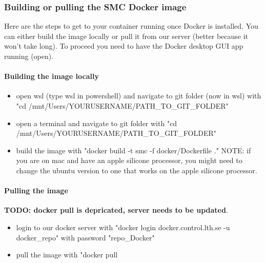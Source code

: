 \subsubsection{Building or pulling the SMC Docker image}
Here are the steps to get to your container running once Docker is installed.
You can either build the image locally or pull it from our server (better because it won't take long).
To proceed you need to have the Docker desktop GUI app running (open).

\paragraph{ Building the image locally}
\begin{itemize}
\item [WINDOWS] open wsl (type wsl in powershell) and navigate to git folder (now in wsl) with 
		\newline
		"cd /mnt/Users/YOURUSERNAME/PATH\_TO\_GIT\_FOLDER"
\item [MAC] open a terminal and navigate to git folder with 
		\newline
		"cd /mnt/Users/YOURUSERNAME/PATH\_TO\_GIT\_FOLDER"
\item build the image with "docker build -t smc -f docker/Dockerfile ." NOTE: if you are on mac and have an apple silicone processor,
    you might need to change the ubuntu version to one that works on the apple silicone processor.
\end{itemize}

\paragraph{Pulling the image}
\textbf{TODO: docker pull is depricated, server needs to be updated}.
\begin{itemize}
\item login to our docker server with "docker login docker.control.lth.se -u docker\_repo" with password "repo\_Docker"
\item pull the image with "docker pull 
\end{itemize}

